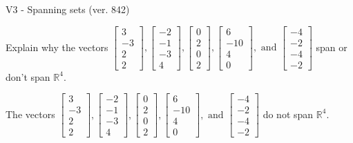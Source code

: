 \begin{exercise}
  \begin{exerciseTitle}V3 - Spanning sets (ver. 842)\end{exerciseTitle}
  \begin{exerciseStatement}
    Explain why the vectors \(\left[\begin{array}{r}
3 \\
-3 \\
2 \\
2
\end{array}\right] , \left[\begin{array}{r}
-2 \\
-1 \\
-3 \\
4
\end{array}\right] , \left[\begin{array}{r}
0 \\
2 \\
0 \\
2
\end{array}\right] , \left[\begin{array}{r}
6 \\
-10 \\
4 \\
0
\end{array}\right] , \text{ and } \left[\begin{array}{r}
-4 \\
-2 \\
-4 \\
-2
\end{array}\right]\) span or don't span \(\mathbb{R}^4\). 
	


  \end{exerciseStatement}
  \begin{exerciseAnswer}
   The vectors \(\left[\begin{array}{r}
3 \\
-3 \\
2 \\
2
\end{array}\right] , \left[\begin{array}{r}
-2 \\
-1 \\
-3 \\
4
\end{array}\right] , \left[\begin{array}{r}
0 \\
2 \\
0 \\
2
\end{array}\right] , \left[\begin{array}{r}
6 \\
-10 \\
4 \\
0
\end{array}\right] , \text{ and } \left[\begin{array}{r}
-4 \\
-2 \\
-4 \\
-2
\end{array}\right]\) 
  	 do not  
	span \(\mathbb{R}^4\).
  



\end{exerciseAnswer}
\end{exercise}
